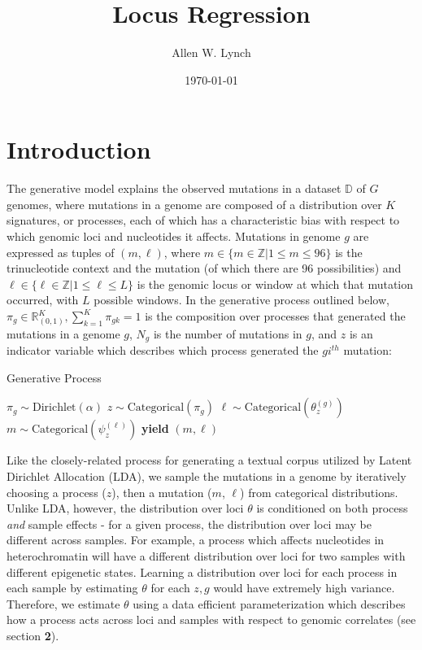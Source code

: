 \documentclass{article}
\author{Allen W. Lynch}
\title{Locus Regression}
\date{\today}
\begin{document}
\maketitle


\section{Introduction}

The generative model explains the observed mutations in a dataset $\mathbb{D}$ of $G$ genomes, where mutations in a genome are composed of a 
distribution over $K$ signatures, or processes, each of which has a characteristic bias with respect to which genomic loci and nucleotides it affects. 
Mutations in genome $g$ are expressed as tuples of $(m,\ell)$, where $m \in \{ m \in \mathbb{Z} | 1 \leq m \leq 96\}$ is the trinucleotide context and the mutation (of which there are 96 possibilities)
and $\ell \in \{ \ell \in \mathbb{Z} | 1 \leq \ell \leq L \}$ is the genomic locus or window at which that mutation occurred, with $L$ possible windows. 
In the generative process outlined below, $\pi_g \in \mathbb{R}_{(0,1)}^K, \sum_{k=1}^K \pi_{gk} = 1$ is the composition over processes that generated the mutations in a genome $g$,
$N_g$ is the number of mutations in $g$, and $z$ is an indicator variable which describes which process generated the $gi^{th}$ mutation:

\begin{algorithm}
\caption{Generative Process}
\begin{algorithmic}
  \scriptsize
  	\STATE $ \pi_g \sim \textrm{Dirichlet}( \alpha ) $
  		\STATE $ z \sim \textrm{Categorical}( \pi_g ) $
  		\STATE $ \ell \sim \textrm{Categorical}( \theta^{(g)}_{z} ) $
  		\STATE $ m \sim \textrm{Categorical}( \psi^{(\ell)}_z ) $
  		\STATE \textbf{yield} $(m,\ell)$
  	\ENDFOR
  \ENDFOR
\end{algorithmic}
\end{algorithm}

Like the closely-related process for generating a textual corpus utilized by Latent Dirichlet Allocation (LDA), we sample the mutations in a genome by
iteratively choosing a process ($z$), then a mutation ($m$, $\ell$) from categorical distributions. Unlike LDA, however, the distribution over loci $\theta$ 
is conditioned on both process \emph{and} sample effects - for a given process, the distribution over loci may be different across samples. For example, a process which
affects nucleotides in heterochromatin will have a different distribution over loci for two samples with different epigenetic states. Learning a distribution over loci for 
each process in each sample by estimating $\theta$ for each $z,g$ would have extremely high variance.
Therefore, we estimate $\theta$ using a data efficient parameterization which describes how a process acts across loci and samples with respect to genomic correlates (see section \textbf{2}).
\end{document}
